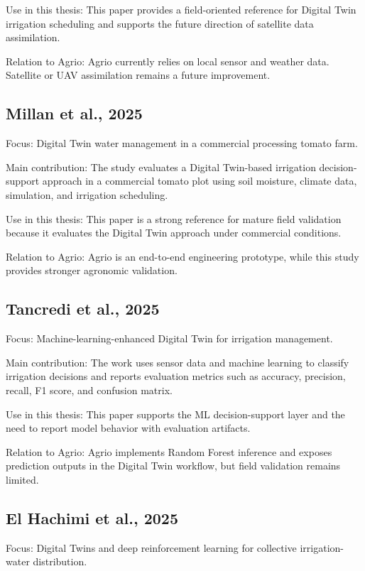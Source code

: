 Use in this thesis: This paper provides a field-oriented reference for Digital Twin irrigation scheduling and supports the future direction of satellite data assimilation.

Relation to Agrio: Agrio currently relies on local sensor and weather data. Satellite or UAV assimilation remains a future improvement.

\subsection{Millan et al., 2025}

Focus: Digital Twin water management in a commercial processing tomato farm.

Main contribution: The study evaluates a Digital Twin-based irrigation decision-support approach in a commercial tomato plot using soil moisture, climate data, simulation, and irrigation scheduling.

Use in this thesis: This paper is a strong reference for mature field validation because it evaluates the Digital Twin approach under commercial conditions.

Relation to Agrio: Agrio is an end-to-end engineering prototype, while this study provides stronger agronomic validation.

\subsection{Tancredi et al., 2025}

Focus: Machine-learning-enhanced Digital Twin for irrigation management.

Main contribution: The work uses sensor data and machine learning to classify irrigation decisions and reports evaluation metrics such as accuracy, precision, recall, F1 score, and confusion matrix.

Use in this thesis: This paper supports the ML decision-support layer and the need to report model behavior with evaluation artifacts.

Relation to Agrio: Agrio implements Random Forest inference and exposes prediction outputs in the Digital Twin workflow, but field validation remains limited.

\subsection{El Hachimi et al., 2025}

Focus: Digital Twins and deep reinforcement learning for collective irrigation-water distribution.

